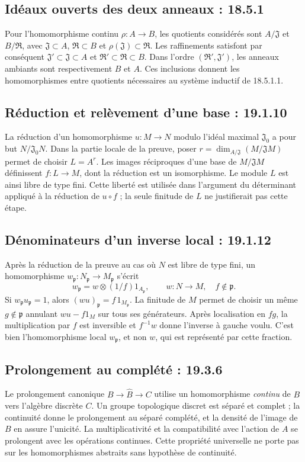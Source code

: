 \documentclass[11pt,a4paper]{article}
\begin{document}
\subsection{Idéaux ouverts des deux anneaux : 18.5.1}
\label{note:iv1-4}
Pour l'homomorphisme continu $\rho:A\to B$, les quotients considérés
sont $A/\mathfrak J$ et $B/\mathfrak R$, avec
$\mathfrak J\subset A$, $\mathfrak R\subset B$ et
$\rho(\mathfrak J)\subset\mathfrak R$.
Les raffinements satisfont par conséquent
$\mathfrak J'\subset\mathfrak J\subset A$ et
$\mathfrak R'\subset\mathfrak R\subset B$.
Dans l'ordre $(\mathfrak R',\mathfrak J')$, les anneaux ambiants sont
respectivement $B$ et $A$. Ces inclusions donnent les homomorphismes
entre quotients nécessaires au système inductif de 18.5.1.1.

\subsection{Réduction et relèvement d'une base : 19.1.10}
\label{note:iv1-5}
La réduction d'un homomorphisme $u:M\to N$ modulo l'idéal maximal
$\mathfrak J_0$ a pour but $N/\mathfrak J_0N$.
Dans la partie locale de la preuve, poser
$r=\dim_{A/\mathfrak J}(M/\mathfrak JM)$ permet de choisir
$L=A^r$. Les images réciproques d'une base de $M/\mathfrak JM$
définissent $f:L\to M$, dont la réduction est un isomorphisme.
Le module $L$ est ainsi libre de type fini. Cette liberté est utilisée
dans l'argument du déterminant appliqué à la réduction de $u\circ f$ ;
la seule finitude de $L$ ne justifierait pas cette étape.

\subsection{Dénominateurs d'un inverse local : 19.1.12}
\label{note:iv1-6}
Après la réduction de la preuve au cas où $N$ est libre de type fini,
un homomorphisme
$w_{\mathfrak p}:N_{\mathfrak p}\to M_{\mathfrak p}$ s'écrit
\[
 w_{\mathfrak p}=w\otimes(1/f)1_{A_{\mathfrak p}},
 \qquad w:N\to M,\quad f\notin\mathfrak p.
\]
Si $w_{\mathfrak p}u_{\mathfrak p}=1$, alors
$(wu)_{\mathfrak p}=f\,1_{M_{\mathfrak p}}$.
La finitude de $M$ permet de choisir un même $g\notin\mathfrak p$
annulant $wu-f1_M$ sur tous ses générateurs. Après localisation en
$fg$, la multiplication par $f$ est inversible et
$f^{-1}w$ donne l'inverse à gauche voulu. C'est bien l'homomorphisme
local $w_{\mathfrak p}$, et non $w$, qui est représenté par cette fraction.

\subsection{Prolongement au complété : 19.3.6}
\label{note:iv1-7}
Le prolongement canonique $B\to\widehat B\to C$ utilise un
homomorphisme \emph{continu} de $B$ vers l'algèbre discrète $C$.
Un groupe topologique discret est séparé et complet ; la continuité
donne le prolongement au séparé complété, et la densité de l'image de
$B$ en assure l'unicité. La multiplicativité et la compatibilité avec
l'action de $A$ se prolongent avec les opérations continues. Cette
propriété universelle ne porte pas sur les homomorphismes abstraits
sans hypothèse de continuité.
\end{document}
